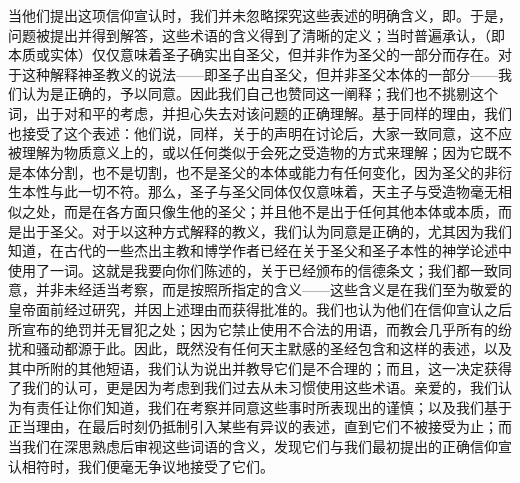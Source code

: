 \par

\par

当他们提出这项信仰宣认时，我们并未忽略探究这些表述的明确含义，即。于是，问题被提出并得到解答，这些术语的含义得到了清晰的定义；当时普遍承认，（即本质或实体）仅仅意味着圣子确实出自圣父，但并非作为圣父的一部分而存在。对于这种解释神圣教义的说法——即圣子出自圣父，但并非圣父本体的一部分——我们认为是正确的，予以同意。因此我们自己也赞同这一阐释；我们也不挑剔这个词，出于对和平的考虑，并担心失去对该问题的正确理解。基于同样的理由，我们也接受了这个表述：他们说，同样，关于的声明在讨论后，大家一致同意，这不应被理解为物质意义上的，或以任何类似于会死之受造物的方式来理解；因为它既不是本体分割，也不是切割，也不是圣父的本体或能力有任何变化，因为圣父的非衍生本性与此一切不符。那么，圣子与圣父同体仅仅意味着，天主子与受造物毫无相似之处，而是在各方面只像生他的圣父；并且他不是出于任何其他本体或本质，而是出于圣父。对于以这种方式解释的教义，我们认为同意是正确的，尤其因为我们知道，在古代的一些杰出主教和博学作者已经在关于圣父和圣子本性的神学论述中使用了一词。这就是我要向你们陈述的，关于已经颁布的信德条文；我们都一致同意，并非未经适当考察，而是按照所指定的含义——这些含义是在我们至为敬爱的皇帝面前经过研究，并因上述理由而获得批准的。我们也认为他们在信仰宣认之后所宣布的绝罚并无冒犯之处；因为它禁止使用不合法的用语，而教会几乎所有的纷扰和骚动都源于此。因此，既然没有任何天主默感的圣经包含和这样的表述，以及其中所附的其他短语，我们认为说出并教导它们是不合理的；而且，这一决定获得了我们的认可，更是因为考虑到我们过去从未习惯使用这些术语。亲爱的，我们认为有责任让你们知道，我们在考察并同意这些事时所表现出的谨慎；以及我们基于正当理由，在最后时刻仍抵制引入某些有异议的表述，直到它们不被接受为止；而当我们在深思熟虑后审视这些词语的含义，发现它们与我们最初提出的正确信仰宣认相符时，我们便毫无争议地接受了它们。\par

